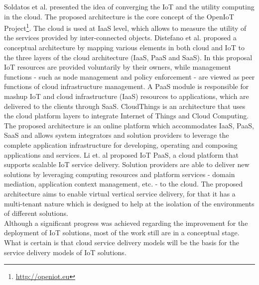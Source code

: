 Soldatos et al. \cite{soldatos2012convergence} presented the idea of converging the IoT
and the utility computing in the cloud. The proposed architecture is the core concept of the OpenIoT
Project\footnote{\url{http://openiot.eu}}. The cloud is used at \gls{IaaS} level, which allows
to measure the utility of the services provided by inter-connected objects.
Distefano et al. \cite{distefano2012enabling} proposed a conceptual architecture by
mapping various elements in both cloud and IoT to the three layers of the cloud architecture (\gls{IaaS},
\gls{PaaS} and \gls{SaaS}). In this proposal IoT resources are provided voluntarily by their owners,
while management functions - such as node management and policy enforcement - are viewed as peer
functions of cloud infrastructure management. A \gls{PaaS} module is responsible for mashup IoT and
cloud infrastructure (\gls{IaaS}) resources to applications, which are delivered to the clients
through \gls{SaaS}.
CloudThings \cite{zhou2013cloudthings} is an architecture that uses the cloud platform layers to
integrate Internet of Things and Cloud Computing. The proposed architecture is an online platform
which accommodates \gls{IaaS}, \gls{PaaS}, \gls{SaaS} and allows system integrators and solution
providers to leverage the complete application infrastructure for developing, operating and composing
applications and services.
Li et. al \cite{li2013efficient} proposed IoT PaaS, a cloud platform that supports
scalable IoT service delivery. Solution providers are able to deliver new solutions by leveraging
computing resources and platform services - domain mediation, application context management, etc.
- to the cloud. The proposed architecture aims to enable virtual vertical service delivery, for that
it has a multi-tenant nature which is designed to help at the isolation of the environments of
different solutions.\\

Although a significant progress was achieved regarding the improvement for the deployment of \gls{IoT}
solutions, most of the work still are in a conceptual stage. What is certain is that cloud service
delivery models will be the basis for the service delivery models of \gls{IoT} solutions.

